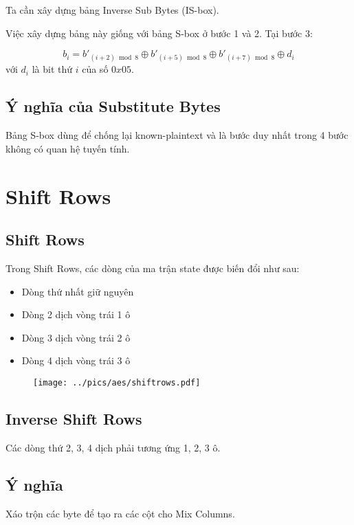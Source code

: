 Ta cần xây dựng bảng Inverse Sub Bytes (IS-box).

Việc xây dựng bảng này giống với bảng S-box ở bước 1 và 2. Tại bước 3:

\[ b_i = b'_{(i+2) \bmod 8} \oplus b'_{(i+5) \bmod 8} \oplus b'_{(i+7) \bmod 8} \oplus d_i \]
với $d_i$ là bit thứ $i$ của số $0x05$.

\subsection{Ý nghĩa của Substitute Bytes}

Bảng S-box dùng để chống lại known-plaintext và là bước duy nhất trong 4 bước không có quan hệ tuyến tính.

\section{Shift Rows}

\subsection{Shift Rows}

Trong Shift Rows, các dòng của ma trận state được biến đổi như sau:

\begin{itemize}
    \item Dòng thứ nhất giữ nguyên
    \item Dòng 2 dịch vòng trái 1 ô
    \item Dòng 3 dịch vòng trái 2 ô
    \item Dòng 4 dịch vòng trái 3 ô
\end{itemize}

\begin{figure}[ht]
    \centering
    \texttt{[image: ../pics/aes/shiftrows.pdf]}
\end{figure}

\subsection{Inverse Shift Rows}

Các dòng thứ 2, 3, 4 dịch phải tương ứng 1, 2, 3 ô.

\subsection{Ý nghĩa}

Xáo trộn các byte để tạo ra các cột cho Mix Columns.

